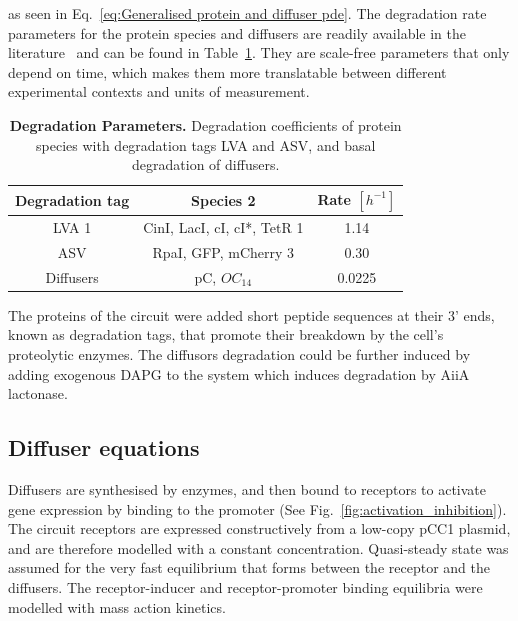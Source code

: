 as seen in Eq.~\ref{eq:Generalised protein and diffuser pde}.
The degradation rate parameters for the protein species and diffusers are readily available in the literature~\parencite{Andersen1998,Kaufmann2005} and can be found in Table~\ref{table:degradation table}.
They are scale-free parameters that only depend on time, which makes them more translatable between different experimental contexts and units of measurement. %


\begin{table}[H]
    \centering
    \begin{tabular}{|c|c|c|}
        \hline
        Degradation tag & Species 2 & Rate $[h^{-1}]$ \\
        \hline
        LVA 1 & CinI, LacI, cI, cI*, TetR 1 & 1.14 \\
        ASV & RpaI, GFP, mCherry 3 & 0.30 \\
        Diffusers & pC, $OC_{14}$ & 0.0225 \\
        \hline
    \end{tabular}
    \caption{\textbf{Degradation Parameters.} Degradation coefficients of protein species with degradation tags LVA and ASV, and basal degradation of diffusers.}
    \label{table:degradation table}
\end{table}

The proteins of the circuit were added short peptide sequences at their 3’ ends, known as degradation tags, that promote their breakdown by the cell’s proteolytic enzymes.
The diffusors degradation could be further induced by adding exogenous DAPG to the system which induces degradation by AiiA lactonase.






\subsection{Diffuser equations}
Diffusers are synthesised by enzymes, and then bound to receptors to activate gene expression by binding to the promoter (See Fig.~\ref{fig:activation_inhibition}). %
The circuit receptors are expressed constructively from a low-copy pCC1 plasmid, and are therefore modelled with a constant concentration.
Quasi-steady state was assumed for the very fast equilibrium that forms between the receptor and the diffusers.
The receptor-inducer and receptor-promoter binding equilibria were modelled with mass action kinetics.

